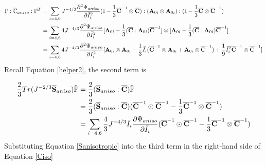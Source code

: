 \begin{equation} \label{part13}
\begin{split}
\mathbb{P} : \overline{\mathbb{C}}_{aniso} : \mathbb{P}^T 
&= \sum_{i = 4, 6}J^{-4/3}\frac{\partial^2\Psi_{aniso}}{\partial{\bar{I}_i}^2} (\mathbb{I} - \frac{1}{3}\overline{\bold{C}}^{-1} \otimes \overline{\bold{C}}):(\bold{A}_{0i} \otimes \bold{A}_{0i}):(\mathbb{I} - \frac{1}{3}\overline{\bold{C}} \otimes \overline{\bold{C}}^{-1}) \\
&= \sum_{i = 4, 6} 4J^{-4/3}\frac{\partial^2\Psi_{aniso}}{\partial{\bar{I}_i}^2}
[\bold{A}_{0i} - \frac{1}{3}(\overline{\bold{C}} : \bold{A}_{0i})\overline{\bold{C}}^{-1}] \otimes
[\bold{A}_{0i} - \frac{1}{3}(\overline{\bold{C}} : \bold{A}_{0i})\overline{\bold{C}}^{-1}] \\
&= \sum_{i = 4, 6} 4J^{-4/3}\frac{\partial^2\Psi_{aniso}}{\partial{\bar{I}_i}^2}
[\bold{A}_{0i} \otimes \bold{A}_{0i} - \frac{1}{3}\bar{I}_i
(\overline{\bold{C}}^{-1} \otimes \bold{A}_{0i} + \bold{A}_{0i} \otimes \overline{\bold{C}}^{-1}) 
+ \frac{1}{9}\bar{I}_i^2 \overline{\bold{C}}^{-1} \otimes \overline{\bold{C}}^{-1}]
\end{split}
\end{equation}
Recall Equation \ref{helper2}, the second term is

\begin{equation} \label{part23}
\begin{split}
\frac{2}{3}Tr(J^{-2/3}\overline{\bold{S}}_{aniso})\tilde{\mathbb{P}} &= \frac{2}{3}(\overline{\bold{S}}_{aniso} : \overline{\bold{C}}) \tilde{\mathbb{P}} \\
&= \frac{2}{3}(\overline{\bold{S}}_{aniso} : \overline{\bold{C}}) 
(\overline{\bold{C}}^{-1} \odot \overline{\bold{C}}^{-1} - \frac{1}{3}\overline{\bold{C}}^{-1}\otimes\overline{\bold{C}}^{-1}) \\
&= \sum_{i = 4, 6}\frac{4}{3}J^{-4/3}\bar{I}_i\frac{\partial{\Psi_{aniso}}}{\partial\bar{I}_i}
(\overline{\bold{C}}^{-1} \odot \overline{\bold{C}}^{-1} - \frac{1}{3}\overline{\bold{C}}^{-1}\otimes\overline{\bold{C}}^{-1}) \\
\end{split}
\end{equation}
Substituting Equation \ref{Sanisotropic} into the third term in the right-hand side of Equation \ref{Ciso}

